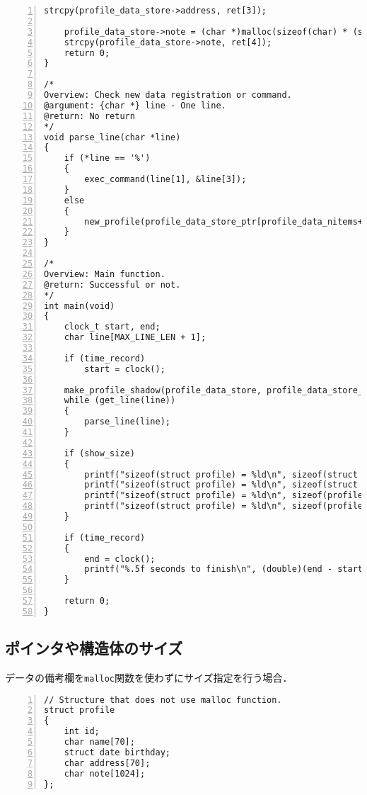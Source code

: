 \documentclass[autodetect-engine,dvi=dvipdfmx,ja=standard,
               a4j,11pt]{bxjsarticle}
\begin{document}
\begin{Verbatim}[numbers=left, xleftmargin=10mm, numbersep=6pt,
    fontsize=\small, baselinestretch=0.8]
    strcpy(profile_data_store->address, ret[3]);

    profile_data_store->note = (char *)malloc(sizeof(char) * (strlen(ret[4]) + 1));
    strcpy(profile_data_store->note, ret[4]);
    return 0;
}

/*
Overview: Check new data registration or command.
@argument: {char *} line - One line.
@return: No return
*/
void parse_line(char *line)
{
    if (*line == '%')
    {
        exec_command(line[1], &line[3]);
    }
    else
    {
        new_profile(profile_data_store_ptr[profile_data_nitems++], line);
    }
}

/*
Overview: Main function.
@return: Successful or not.
*/
int main(void)
{
    clock_t start, end;
    char line[MAX_LINE_LEN + 1];

    if (time_record)
        start = clock();

    make_profile_shadow(profile_data_store, profile_data_store_ptr, 10000);
    while (get_line(line))
    {
        parse_line(line);
    }

    if (show_size)
    {
        printf("sizeof(struct profile) = %ld\n", sizeof(struct profile));
        printf("sizeof(struct profile) = %ld\n", sizeof(struct profile *));
        printf("sizeof(struct profile) = %ld\n", sizeof(profile_data_store));
        printf("sizeof(struct profile) = %ld\n", sizeof(profile_data_store_ptr));
    }

    if (time_record)
    {
        end = clock();
        printf("%.5f seconds to finish\n", (double)(end - start) / CLOCKS_PER_SEC);
    }

    return 0;
}

\end{Verbatim}


\subsection{ポインタや構造体のサイズ} \label{sec:8.2}

データの備考欄を\verb|malloc|関数を使わずにサイズ指定を行う場合．

\begin{Verbatim}[numbers=left, xleftmargin=10mm, numbersep=6pt,
    fontsize=\small, baselinestretch=0.8]
// Structure that does not use malloc function.
struct profile
{
    int id;
    char name[70];
    struct date birthday;
    char address[70];
    char note[1024];
};

\end{Verbatim}
\end{document}

